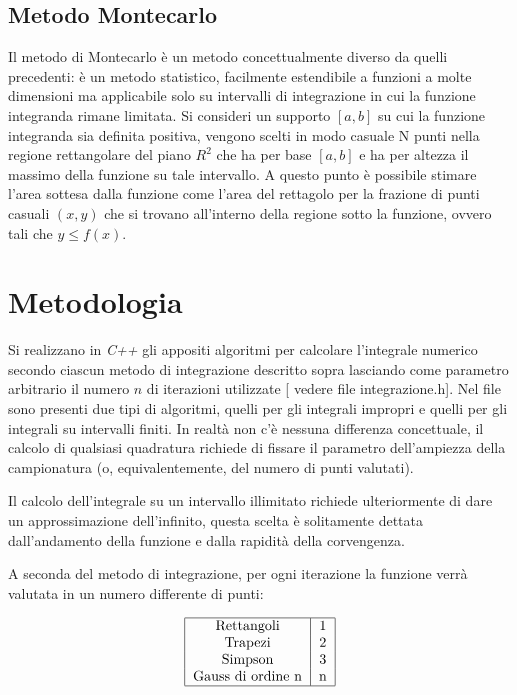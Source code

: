 \documentclass{article}
\begin{document}
\subsection{Metodo Montecarlo}
Il metodo di Montecarlo è un metodo concettualmente diverso da quelli precedenti: è un metodo statistico, facilmente estendibile a funzioni a molte dimensioni ma applicabile solo su intervalli di integrazione in cui la funzione integranda rimane limitata.
Si consideri un supporto $[a,b]$ su cui la funzione integranda sia definita positiva, vengono scelti in modo casuale N punti nella regione rettangolare del piano $R^{2}$ che ha per base $[a,b]$ e ha per altezza il massimo della funzione su tale intervallo.
A questo punto è possibile stimare l'area sottesa dalla funzione come l'area del rettagolo per la frazione di punti casuali $(x,y)$ che si trovano all'interno della regione sotto la funzione, ovvero tali che $y \leq f(x)$.

\section{Metodologia}
Si realizzano in \emph{C++} gli appositi algoritmi per calcolare l'integrale numerico secondo ciascun metodo di integrazione descritto sopra lasciando come parametro arbitrario il numero $n$ di iterazioni utilizzate [ vedere file integrazione.h].
Nel file sono presenti due tipi di algoritmi, quelli per gli integrali impropri e quelli per gli integrali su intervalli finiti. In realtà non c'è nessuna differenza concettuale, il calcolo di qualsiasi quadratura richiede di fissare il parametro dell'ampiezza della campionatura (o, equivalentemente, del numero di punti valutati). 

Il calcolo dell'integrale su un intervallo illimitato richiede ulteriormente di dare un approssimazione dell'infinito, questa scelta è solitamente dettata dall'andamento della funzione e dalla rapidità della corvengenza.

A seconda del metodo di integrazione, per ogni iterazione la funzione verrà valutata in un numero differente di punti:

\begin{displaymath}		
		\begin{tabular}{|c|c|}
		\hline
		\textrm{Rettangoli} & 1 \\
		\textrm{Trapezi} & 2 \\
		\textrm{Simpson} & 3 \\
		\textrm{Gauss di ordine n} & n \\
		\hline
		\end{tabular} 
\end{displaymath}
\end{document}
